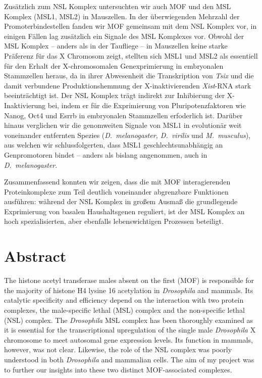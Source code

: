 Zusätzlich zum NSL Komplex untersuchten wir auch MOF und den MSL Komplex (MSL1, MSL2) in Mauszellen. In der überwiegenden Mehrzahl der Promoterbindestellen fanden wir MOF gemeinsam mit dem NSL Komplex vor, in einigen Fällen lag zusätzlich ein Signale des MSL Komplexes vor. Obwohl der MSL Komplex -- anders als in der Taufliege -- in Mauszellen keine starke Präferenz für das X Chromosom zeigt, stellten sich MSL1 und MSL2 als essentiell für den Erhalt der X-chromosomalen Genexprimierung in embryonalen Stammzellen heraus, da in ihrer Abwesenheit die Transkription von \textit{Tsix} und die damit verbundene Produktionshemmung der X-inaktivierenden \textit{Xist}-RNA stark beeinträchtigt ist. Der NSL Komplex trägt indirekt zur Inhibierung der X-Inaktivierung bei, indem er für die Exprimierung von Pluripotenzfaktoren wie Nanog, Oct4 und Esrrb in embryonalen Stammzellen erfoderlich ist. Darüber hinaus verglichen wir die genomweiten Signale von MSL1 in evolutionär weit voneinander entfernten Spezies (\textit{D.~melanogaster, D.~virilis} und \textit{M.~musculus}), aus welchen wir schlussfolgerten, dass MSL1 geschlechtsunabhängig an Genpromotoren bindet -- anders als bislang angenommen, auch in \textit{D.~melanogaster}.

Zusammenfassend konnten wir zeigen, dass die mit MOF interagierenden Proteinkomplexe zum Teil deutlich voneinander abgrenzbare Funktionen ausführen: während der NSL Komplex in großem Ausmaß die grundlegende Exprimierung von basalen Haushaltsgenen reguliert, ist der MSL Komplex an hoch spezialisierten, aber ebenfalls lebenswichtigen Prozessen beteiligt.


\section{Abstract}

The histone acetyl transferase males absent on the first (MOF) is responsible for the majority of histone H4 lysine 16 acetylation in \textit{Drosophila} and mammals. Its catalytic specificity and efficiency depend on the interaction with two protein complexes, the male-specific lethal (MSL) complex and the non-specific lethal (NSL) complex. The \textit{Drosophila} MSL complex has been thoroughly examined as it is essential for the transcriptional upregulation of the single male \textit{Drosophila} X chromosome to meet autosomal gene expression levels. Its function in mammals, however, was not clear. Likewise, the role of the NSL complex was poorly understood in both \textit{Drosophila} and mammalian cells. The aim of my project was to further our insights into these two distinct MOF-associated complexes.

